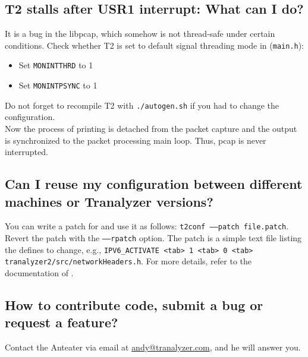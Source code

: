 \documentclass[documentation]{subfiles}
\begin{document}
\subsection{T2 stalls after USR1 interrupt: What can I do?}
It is a bug in the libpcap, which somehow is not thread-safe under certain conditions.
Check whether T2 is set to default signal threading mode in ({\tt main.h}):
\begin{itemize}
    \item Set {\tt MONINTTHRD} to 1
    \item Set {\tt MONINTPSYNC} to 1
\end{itemize}
Do not forget to recompile T2 with {\tt ./autogen.sh} if you had to change the configuration.\\

Now the process of printing is detached from the packet capture and the output is synchronized to the packet processing main loop.
Thus, pcap is never interrupted.\\


\subsection{Can I reuse my configuration between different machines or Tranalyzer versions?}
You can write a patch for  and use it as follows: {\tt t2conf --{}--patch file.patch}.
Revert the patch with the {\tt --{}--rpatch} option.
The patch is a simple text file listing the defines to change, e.g., {\tt IPV6\_ACTIVATE <tab> 1 <tab> 0 <tab> tranalyzer2/src/networkHeaders.h}.
For more details, refer to the documentation of .

\subsection{How to contribute code, submit a bug or request a feature?}
Contact the Anteater via email at \href{mailto:andy@tranalyzer.com}{andy@tranalyzer.com}, and he will answer you.
\end{document}
